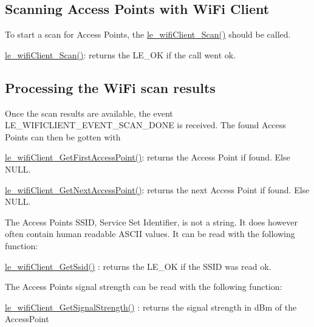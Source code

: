 \hypertarget{c_le_wifi_client_le_wifiClient_scan}{}\subsection{Scanning Access Points with Wi\+Fi Client}\label{c_le_wifi_client_le_wifiClient_scan}
To start a scan for Access Points, the \hyperlink{le__wifi_client__interface_8h_af478b542f65242095c05e1ee61160e2a}{le\+\_\+wifi\+Client\+\_\+\+Scan()} should be called.
\begin{DoxyItemize}
\item \hyperlink{le__wifi_client__interface_8h_af478b542f65242095c05e1ee61160e2a}{le\+\_\+wifi\+Client\+\_\+\+Scan()}\+: returns the L\+E\+\_\+\+OK if the call went ok.
\end{DoxyItemize}\hypertarget{c_le_wifi_client_le_wifiClient_scan_result}{}\subsection{Processing the Wi\+Fi scan results}\label{c_le_wifi_client_le_wifiClient_scan_result}
Once the scan results are available, the event L\+E\+\_\+\+W\+I\+F\+I\+C\+L\+I\+E\+N\+T\+\_\+\+E\+V\+E\+N\+T\+\_\+\+S\+C\+A\+N\+\_\+\+D\+O\+NE is received. The found Access Points can then be gotten with
\begin{DoxyItemize}
\item \hyperlink{le__wifi_client__interface_8h_a284c452c5bd4309e096b6f89a8da653e}{le\+\_\+wifi\+Client\+\_\+\+Get\+First\+Access\+Point()}\+: returns the Access Point if found. Else N\+U\+LL.
\item \hyperlink{le__wifi_client__interface_8h_ab566a61f36b25118f9f38d62863361d2}{le\+\_\+wifi\+Client\+\_\+\+Get\+Next\+Access\+Point()}\+: returns the next Access Point if found. Else N\+U\+LL.
\end{DoxyItemize}

The Access Points S\+S\+ID, Service Set Identifier, is not a string. It does however often contain human readable A\+S\+C\+II values. It can be read with the following function\+:
\begin{DoxyItemize}
\item \hyperlink{le__wifi_client__interface_8h_aa726f6cb7f78e9ed962a6c6d3ae75a91}{le\+\_\+wifi\+Client\+\_\+\+Get\+Ssid()} \+: returns the L\+E\+\_\+\+OK if the S\+S\+ID was read ok.
\end{DoxyItemize}

The Access Points signal strength can be read with the following function\+:
\begin{DoxyItemize}
\item \hyperlink{le__wifi_client__interface_8h_ade417976a142b6e71df49bd8761e9833}{le\+\_\+wifi\+Client\+\_\+\+Get\+Signal\+Strength()} \+: returns the signal strength in d\+Bm of the Access\+Point
\end{DoxyItemize}


